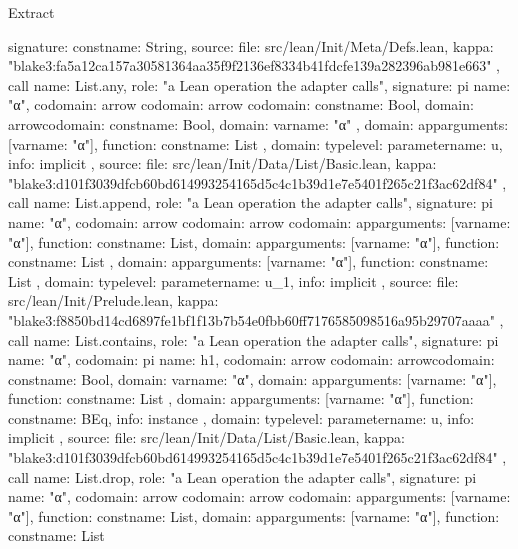 \begin{lexlean}{Extract}
\begin{toolingmodule}
{{      signature: const{name: String},
      source: {
        file: src/lean/Init/Meta/Defs.lean,
        kappa: "blake3:fa5a12ca157a30581364aa35f9f2136ef8334b41fdcfe139a282396ab981e663"
      }
    },
    call{
      name: List.any,
      role: "a Lean operation the adapter calls",
      signature: pi{
        name: "α",
        codomain: arrow{
          codomain: arrow{
            codomain: const{name: Bool},
            domain: arrow{codomain: const{name: Bool}, domain: var{name: "α"}}
          },
          domain: app{arguments: [var{name: "α"}], function: const{name: List}}
        },
        domain: type{level: parameter{name: u}},
        info: implicit
      },
      source: {
        file: src/lean/Init/Data/List/Basic.lean,
        kappa: "blake3:d101f3039dfcb60bd614993254165d5c4c1b39d1e7e5401f265c21f3ac62df84"
      }
    },
    call{
      name: List.append,
      role: "a Lean operation the adapter calls",
      signature: pi{
        name: "α",
        codomain: arrow{
          codomain: arrow{
            codomain: app{arguments: [var{name: "α"}], function: const{name: List}},
            domain: app{arguments: [var{name: "α"}], function: const{name: List}}
          },
          domain: app{arguments: [var{name: "α"}], function: const{name: List}}
        },
        domain: type{level: parameter{name: u_1}},
        info: implicit
      },
      source: {
        file: src/lean/Init/Prelude.lean,
        kappa: "blake3:f8850bd14cd6897fe1bf1f13b7b54e0fbb60ff7176585098516a95b29707aaaa"
      }
    },
    call{
      name: List.contains,
      role: "a Lean operation the adapter calls",
      signature: pi{
        name: "α",
        codomain: pi{
          name: h1,
          codomain: arrow{
            codomain: arrow{codomain: const{name: Bool}, domain: var{name: "α"}},
            domain: app{arguments: [var{name: "α"}], function: const{name: List}}
          },
          domain: app{arguments: [var{name: "α"}], function: const{name: BEq}},
          info: instance
        },
        domain: type{level: parameter{name: u}},
        info: implicit
      },
      source: {
        file: src/lean/Init/Data/List/Basic.lean,
        kappa: "blake3:d101f3039dfcb60bd614993254165d5c4c1b39d1e7e5401f265c21f3ac62df84"
      }
    },
    call{
      name: List.drop,
      role: "a Lean operation the adapter calls",
      signature: pi{
        name: "α",
        codomain: arrow{
          codomain: arrow{
            codomain: app{arguments: [var{name: "α"}], function: const{name: List}},
            domain: app{arguments: [var{name: "α"}], function: const{name: List}}
}}}}}
\end{toolingmodule}
\end{lexlean}
